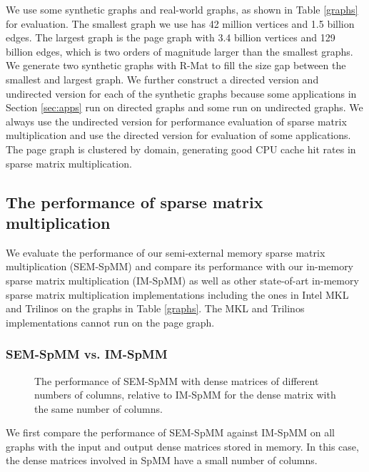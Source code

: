 We use some synthetic graphs and real-world graphs, as shown in Table
\ref{graphs} for evaluation. The smallest graph we use has 42 million vertices
and 1.5 billion
edges. The largest graph is the page graph with 3.4 billion vertices
and 129 billion edges, which is two orders of magnitude larger than the smallest
graphs. We generate two synthetic graphs with R-Mat \cite{rmat} to fill
the size gap between the smallest and largest graph. We further construct
a directed version and undirected version for each of the synthetic graphs
because some applications in Section \ref{sec:apps} run on directed graphs
and some run on undirected graphs. We always use the undirected version for
performance evaluation of sparse matrix multiplication and use the directed
version for evaluation of some applications. The page graph is clustered
by domain, generating good CPU cache hit rates in sparse matrix multiplication.

\subsection{The performance of sparse matrix multiplication}

We evaluate the performance of our semi-external memory sparse matrix
multiplication (SEM-SpMM) and compare its performance with our in-memory sparse
matrix multiplication (IM-SpMM) as well as other state-of-art in-memory sparse
matrix multiplication implementations including the ones in Intel MKL and Trilinos
on the graphs in Table \ref{graphs}. The MKL and Trilinos implementations
cannot run on the page graph.

\subsubsection{SEM-SpMM vs. IM-SpMM}

\begin{figure}
	\begin{center}
		\footnotesize
		
		\caption{The performance of SEM-SpMM with dense matrices of different
			numbers of columns, relative to IM-SpMM for the dense matrix with
			the same number of columns.}
		\label{perf:spmm_comp}
	\end{center}
\end{figure}

We first compare the performance of SEM-SpMM against IM-SpMM on all graphs with
the input and output dense matrices stored in memory. In this case, the dense
matrices involved in SpMM have a small number of columns.

